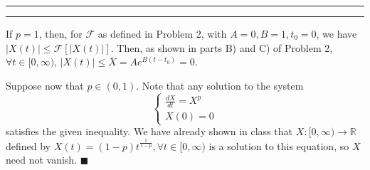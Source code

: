 \documentclass[11pt]{article}
\newcounter{questionCounter}
\newcounter{partCounter}[questionCounter]
\newenvironment{question}[2][\arabic{questionCounter}]{%
    \setcounter{partCounter}{0}%
    \vspace{.25in} \hrule \vspace{0.5em}%
        \noindent{\bf #2}%
    \vspace{0.8em} \hrule \vspace{.10in}%
    \addtocounter{questionCounter}{1}%
}{}
\renewcommand{\qed}{\quad $\blacksquare$}
\newcommand{\R}{\mathbb{R}} %
\newcommand{\F}{\mathcal{F}}
\begin{document}
\begin{question}{Problem 4}
If $p = 1$, then, for $\F$ as defined in Problem 2, with $A = 0, B = 1, t_0 =
0$, we have $|X(t)| \leq \F\left[ |X(t)| \right]$. Then, as shown in parts B)
and C) of Problem 2, $\forall t \in [0,\infty)$,
$|X(t)| \leq \overline{X} = Ae^{B(t - t_0)} = 0$.

Suppose now that $p \in (0,1)$. Note that any solution to the system
\[
\left\{
    \begin{array}{c}
        \frac{dX}{dt} = X^p \\
        X(0) = 0
    \end{array}
\right.
\]
satisfies the given inequality. We have already shown in class that $X :
[0,\infty) \rightarrow \R$ defined by $X(t) = (1 - p)t^{\frac{1}{1 - p}},
\forall t \in [0,\infty)$ is a solution to this equation, so $X$ need not
vanish. \qed
\end{question}
\end{document}
